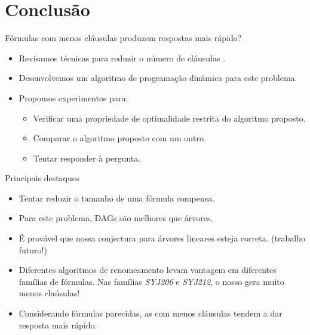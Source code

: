 
\section{Conclusão}

\begin{frame}
	\begin{center}
		Fórmulas com menos cláusulas produzem respostas mais rápido?
	\end{center}
	
	\begin{itemize}
		\pause\item Revisamos técnicas para reduzir o número de cláusulas \cite{plaisted1986structure,de1992optimality,jackson2004clause}.
		\pause\item Desenvolvemos um algoritmo de programação dinâmica para este problema.
		\pause\item Propomos experimentos para:
		\begin{itemize}
			\pause\item Verificar uma propriedade de optimalidade restrita do algoritmo proposto.
			\pause\item Comparar o algoritmo proposto com um outro.
			\pause\item Tentar responder à pergunta.
		\end{itemize}
	\end{itemize}
\end{frame}

\begin{frame}{Principais destaques}
	\begin{itemize}
		\item Tentar reduzir o tamanho de uma fórmula compensa.
		\pause\item Para este problema, DAGs são melhores que árvores.
		\pause\item É provável que nossa conjectura para árvores lineares esteja correta. \pause (trabalho futuro!)
		\pause\item Diferentes algoritmos de renomeamento levam vantagem em diferentes famílias de fórmulas. \pause Nas famílias \emph{SYJ206} e \emph{SYJ212}, o nosso gera muito menos claúsulas!
		\pause\item Considerando fórmulas parecidas, as com menos cláusulas tendem a dar resposta mais rápido.
	\end{itemize}
\end{frame}

